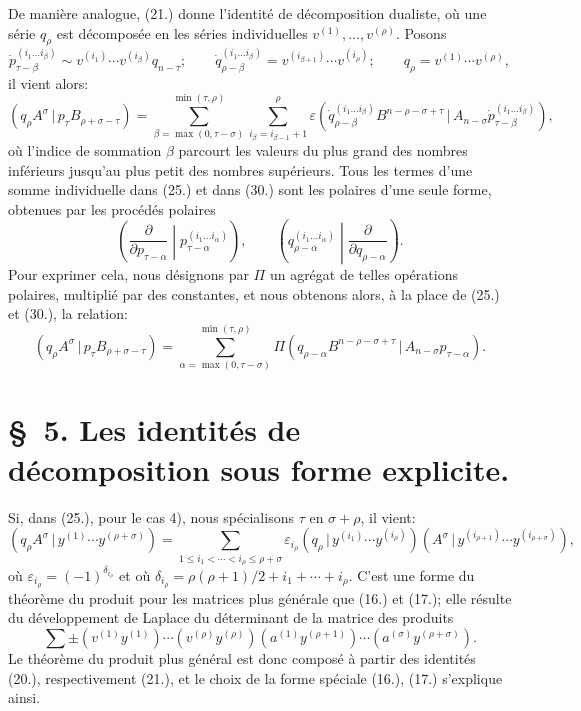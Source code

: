 \documentclass[11pt]{article}
\newcommand{\pair}[2]{(#1\,|\,#2)}
\newcommand{\eps}{\varepsilon}
\begin{document}
De manière analogue, (21.) donne l'identité de décomposition dualiste, où une série $q_\rho$ est décomposée en les séries individuelles $v^{(1)},\ldots,v^{(\rho)}$. Posons
\begin{equation}
 \dot p_{\tau-\beta}^{(i_1\ldots i_\beta)}\sim v^{(i_1)}\cdots v^{(i_\beta)}q_{n-\tau};\qquad
 \dot q_{\rho-\beta}^{(i_1\ldots i_\beta)}=v^{(i_{\beta+1})}\cdots v^{(i_\rho)};\qquad
 q_\rho=v^{(1)}\cdots v^{(\rho)},
\tag{29}
\end{equation}
il vient alors:
\begin{equation}
 \pair{q_\rho A^\sigma}{p_\tau B_{\rho+\sigma-\tau}}
 =\sum_{\beta=\max(0,\tau-\sigma)}^{\min(\tau,\rho)}
   \sum_{i_\beta=i_{\beta-1}+1}^{\rho}\eps
\pair{\dot q_{\rho-\beta}^{(i_1\ldots i_\beta)}B^{n-\rho-\sigma+\tau}}{A_{n-\sigma}\dot p_{\tau-\beta}^{(i_1\ldots i_\beta)}} ,
\tag{30}
\end{equation}
où l'indice de sommation $\beta$ parcourt les valeurs du plus grand des nombres inférieurs jusqu'au plus petit des nombres supérieurs. Tous les termes d'une somme individuelle dans (25.) et dans (30.) sont les polaires d'une seule forme, obtenues par les procédés polaires
\[
\left(\frac{\partial}{\partial p_{\tau-\alpha}}\middle|p_{\tau-\alpha}^{(i_1\ldots i_\alpha)}\right),\qquad
\left(q_{\rho-\alpha}^{(i_1\ldots i_\alpha)}\middle|\frac{\partial}{\partial q_{\rho-\alpha}}\right).
\]
Pour exprimer cela, nous désignons par $\Pi$ un agrégat de telles opérations polaires, multiplié par des constantes, et nous obtenons alors, à la place de (25.) et (30.), la relation:
\begin{equation}
 \pair{q_\rho A^\sigma}{p_\tau B_{\rho+\sigma-\tau}}
 =\sum_{\alpha=\max(0,\tau-\sigma)}^{\min(\tau,\rho)}
 \Pi\pair{q_{\rho-\alpha}B^{n-\rho-\sigma+\tau}}{A_{n-\sigma}p_{\tau-\alpha}}.
\tag{31}
\end{equation}

\section*{\S\ 5. Les identités de décomposition sous forme explicite.}
Si, dans (25.), pour le cas 4), nous spécialisons $\tau$ en $\sigma+\rho$, il vient:
\begin{equation}
 \pair{q_\rho A^\sigma}{y^{(1)}\cdots y^{(\rho+\sigma)}}
 =\sum_{1\le i_1<\cdots<i_\rho\le \rho+\sigma}
 \eps_{i_\rho}\pair{q_\rho}{y^{(i_1)}\cdots y^{(i_\rho)}}
 \pair{A^\sigma}{y^{(i_{\rho+1})}\cdots y^{(i_{\rho+\sigma})}},
\tag{32}
\end{equation}
où $\eps_{i_\rho}=(-1)^{\delta_{i_\rho}}$ et où $\delta_{i_\rho}=\rho(\rho+1)/2+i_1+\cdots+i_\rho$. C'est une forme du théorème du produit pour les matrices plus générale que (16.) et (17.); elle résulte du développement de Laplace du déterminant de la matrice des produits
\[
 \sum\pm(v^{(1)}y^{(1)})\cdots(v^{(\rho)}y^{(\rho)})(a^{(1)}y^{(\rho+1)})\cdots(a^{(\sigma)}y^{(\rho+\sigma)}).
\]
Le théorème du produit plus général est donc composé à partir des identités (20.), respectivement (21.), et le choix de la forme spéciale (16.), (17.) s'explique ainsi.
\end{document}
